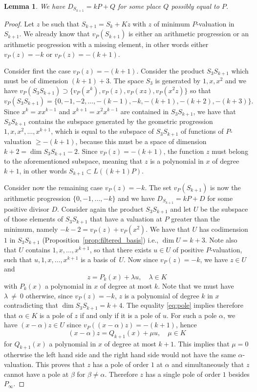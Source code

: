 \documentclass{article}
\theoremstyle{plain}
\newtheorem{lemma}[thm]{Lemma}
\theoremstyle{definition}
\theoremstyle{remark}
\renewcommand{\geq}{\geqslant}
\begin{document}
\begin{lemma}\label{lem:kP+Q}
  We have $D_{S_{k+1}} = kP+Q$
for some place $Q$ possibly equal to $P$.
\end{lemma}

\begin{proof}
 Let $z$ be such that $S_{k+1}=S_k+Kz$ with $z$ of minimum
  $P$-valuation in $S_{k+1}$. We already know that $v_P(S_{k+1})$ is
  either an arithmetic progression or an arithmetic progression with a
  missing element, in other words either $v_P(z)=-k$ or
  $v_P(z)=-(k+1)$.

  Consider first the case $v_P(z)=-(k+1)$. Consider the product
  $S_3S_{k+1}$ which must be of dimension $(k+1)+3$. The space $S_3$
  is generated by $1,x,x^2$ and we have
  $v_P(S_3S_{k+1})\supset\{v_P(x^k), v_P(z), v_P(xz),v_P(x^2z)\}$ so that 
  $$v_P(S_3S_{k+1})=\{0,-1,-2,\ldots,-(k-1),-k,-(k+1),-(k+2),-(k+3)\}.$$
Since $x^k=xx^{k-1}$ and $x^{k+1}=x^2x^{k-1}$ are contained in $S_3S_{k+1}$,
we have that $S_3S_{k+1}$ contains the subspace generated by the
geometric progression $1,x,x^2,\ldots ,x^{k+1}$, which is equal to
the subspace of $S_3S_{k+1}$ of functions of $P$-valuation $\geq
-(k+1)$, because this must be a space of dimension $k+2=\dim
S_3S_{k+1}-2$. 
Since $v_P(z)=-(k+1)$, the function $z$ must belong to the
aforementioned subspace, meaning that $z$
is a polynomial in $x$ of degree $k+1$,
in other words $S_{k+1}\subset L((k+1)P)$.

Consider now the remaining case $v_P(z)=-k$. The set $v_P(S_{k+1})$ is
now the arithmetic progression $\{0,-1,\ldots, -k\}$ and we have
$D_{S_{k+1}}= kP+D$ for some positive divisor $D$. 
Consider again the product $S_3S_{k+1}$ and let $U$
be the subspace of those elements of $S_3S_{k+1}$ that have a
valuation { at $P$}
greater than the minimum, namely $-k-2=v_P(z)+v_P(x^2)$. 
We have that $U$ has codimension $1$
in $S_3S_{k+1}$ (Proposition~\ref{prop:filtered_basis}) i.e., $\dim
U=k+3$. Note also that $U$ contains 
$1,x,\ldots,x^{k+1}$, so that there exists $u\in U$ of positive
$P$-valuation, such that $u,1,x,\ldots,x^{k+1}$ is a basis of~$U$.
Now since $v_P(z)=-k$, we have $z\in U$ and 
\begin{equation}
  \label{eq:pole}
  z = P_{k}(x)+\lambda u, \quad \lambda\in K
\end{equation}
with $P_{k}(x)$ a polynomial in $x$ of degree at most $k$.
Note that we must have $\lambda~\neq~0$ otherwise, since $v_P(z)=-k$,
$z$ is a polynomial of degree $k$ in $x$ contradicting that 
$\dim S_3S_{k+1}=k+4$. The equality \eqref{eq:pole} implies therefore that
$\alpha\in K$ is a pole of $z$ if and only if it is a pole of $u$.
For such a pole $\alpha$, we have $(x-\alpha)z\in U$ since
$v_P((x-\alpha)z)=-(k+1)$, hence
 $$(x-\alpha)z = Q_{k+1}(x) + \mu u, \quad \mu\in K$$
for $Q_{k+1}(x)$ a polynomial in $x$ of degree at most $k+1$.
This implies that $\mu=0$ otherwise the left hand side and the right
hand side would not have the same $\alpha$-valuation. This
proves that $z$ has a pole of order $1$ at $\alpha$ and
simultaneously that $z$ cannot have a pole at $\beta$ for $\beta\neq \alpha$.
Therefore $z$ has a single pole of order $1$ besides $P_\infty$.
\end{proof}
\end{document}
